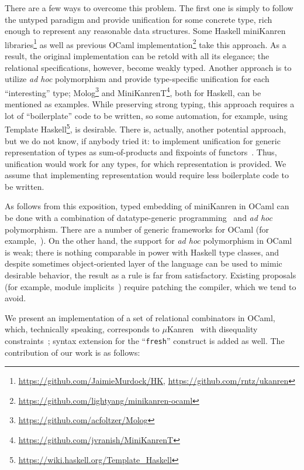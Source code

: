 There are a few ways to overcome this problem. The first one is simply to follow the untyped paradigm and
provide unification for some concrete type, rich enough to represent any reasonable data structures.
Some Haskell miniKanren libraries\footnote{\url{https://github.com/JaimieMurdock/HK}, \url{https://github.com/rntz/ukanren}}
as well as previous OCaml implementation\footnote{\url{https://github.com/lightyang/minikanren-ocaml}} take this approach. 
As a result, the original implementation can be retold with all its elegance; the relational specifications, however,
become weakly typed. Another approach is to utilize \emph{ad hoc} polymorphism and provide type-specific
unification for each ``interesting'' type; Molog\footnote{\url{https://github.com/acfoltzer/Molog}} and 
MiniKanrenT\footnote{\url{https://github.com/jvranish/MiniKanrenT}}, both for Haskell, can be mentioned as examples.
While preserving strong typing, this approach requires a lot of ``boilerplate'' code to be written, so some
automation, for example, using Template Haskell\footnote{\url{https://wiki.haskell.org/Template_Haskell}},
is desirable. There is, actually, another potential approach, but we do not know, if anybody tried
it: to implement unification for generic representation of types as sum-of-products and fixpoints of 
functors~\cite{InstantGenerics, ALaCarte}. Thus, unification would work for any types, for which representation
is provided. We assume that implementing representation would require less boilerplate code to be written.

As follows from this exposition, typed embedding of miniKanren in OCaml can be done with
a combination of datatype-generic programming~\cite{DGP} and \emph{ad hoc} polymorphism. There are a 
number of generic frameworks for OCaml (for example,~\cite{Deriving}). On the other hand, the support
for \emph{ad hoc} polymorphism in OCaml is weak; there is nothing comparable in power with Haskell 
type classes, and despite sometimes object-oriented layer of the language can be used to mimic
desirable behavior, the result as a rule is far from satisfactory. Existing proposals (for example, 
module implicits~\cite{Implicits}) require patching the compiler, which we tend to avoid.

We present an implementation of a set of relational combinators in OCaml, which, technically speaking, 
corresponds to $\mu$Kanren~\cite{MicroKanren} with disequality constraints~\cite{CKanren}; syntax extension 
for the ``\lstinline{fresh}'' construct is added as well. The contribution of our work is as follows:

